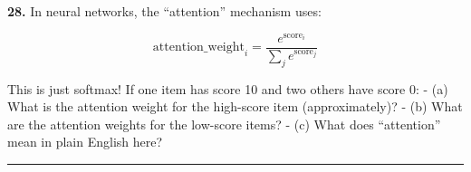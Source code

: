 \documentclass[
  11pt,
]{article}
\begin{document}
\textbf{28.} In neural networks, the ``attention'' mechanism uses:

\[\text{attention\_weight}_i = \dfrac{e^{\text{score}_i}}{\sum_j e^{\text{score}_j}}\]

This is just softmax! If one item has score 10 and two others have score
0: - (a) What is the attention weight for the high-score item
(approximately)? - (b) What are the attention weights for the low-score
items? - (c) What does ``attention'' mean in plain English here?

\begin{center}\rule{0.5\linewidth}{0.5pt}\end{center}
\end{document}
